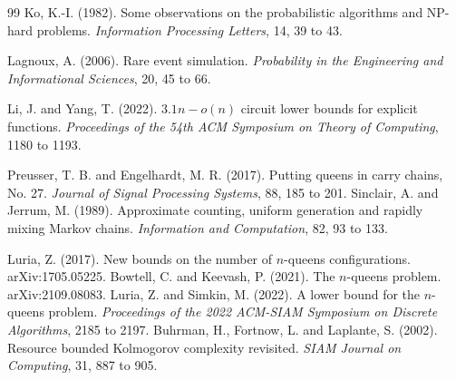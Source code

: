 \documentclass[11pt,twoside,openany]{book}
\theoremstyle{plain}
\theoremstyle{definition}
\theoremstyle{remark}
\begin{document}
\begin{thebibliography}{99}
 Ko, K.-I. (1982). Some observations on the probabilistic algorithms and NP-hard problems. \emph{Information Processing Letters}, 14, 39 to 43.

 Lagnoux, A. (2006). Rare event simulation. \emph{Probability in the Engineering and Informational Sciences}, 20, 45 to 66.

 Li, J. and Yang, T. (2022). $3.1n - o(n)$ circuit lower bounds for explicit functions. \emph{Proceedings of the 54th ACM Symposium on Theory of Computing}, 1180 to 1193.

 Preusser, T. B. and Engelhardt, M. R. (2017). Putting queens in carry chains, No. 27. \emph{Journal of Signal Processing Systems}, 88, 185 to 201.
 Sinclair, A. and Jerrum, M. (1989). Approximate counting, uniform generation and rapidly mixing Markov chains. \emph{Information and Computation}, 82, 93 to 133.


 Luria, Z. (2017). New bounds on the number of $n$-queens configurations. arXiv:1705.05225.
 Bowtell, C. and Keevash, P. (2021). The $n$-queens problem. arXiv:2109.08083.
 Luria, Z. and Simkin, M. (2022). A lower bound for the $n$-queens problem. \emph{Proceedings of the 2022 ACM-SIAM Symposium on Discrete Algorithms}, 2185 to 2197.
 Buhrman, H., Fortnow, L. and Laplante, S. (2002). Resource bounded Kolmogorov complexity revisited. \emph{SIAM Journal on Computing}, 31, 887 to 905.
\end{thebibliography}

\cleardoublepage
{}
\printindex
\cleardoublepage
\thispagestyle{empty}
\mbox{}
\end{document}
